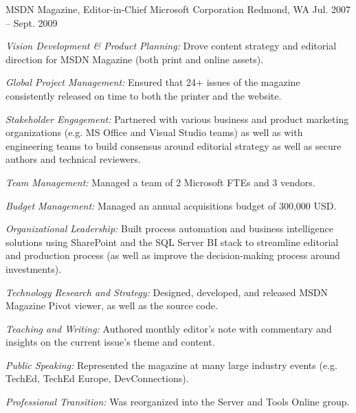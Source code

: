 \begin{cventries}
\cventry
{MSDN Magazine, Editor-in-Chief}
{Microsoft Corporation}
{Redmond, WA}
{Jul. 2007 – Sept. 2009}
{ %
\begin{cvitems}
\item {\emph{Vision Development \& Product Planning:} Drove content strategy and editorial direction for MSDN Magazine (both print and online assets).}
\item {\emph{Global Project Management:} Ensured that 24+ issues of the magazine consistently released on time to both the printer and the website.}
\item {\emph{Stakeholder Engagement:} Partnered with various business and product marketing organizations (e.g. MS Office and Visual Studio teams) as well as with engineering teams to build consensus around editorial strategy as well as secure authors and technical reviewers.}
\item {\emph{Team Management:} Managed a team of 2 Microsoft FTEs and 3 vendors.}
\item {\emph{Budget Management:} Managed an annual acquisitions budget of 300,000 USD.}
\item {\emph{Organizational Leadership:} Built process automation and business intelligence solutions using SharePoint and the SQL Server BI stack to streamline editorial and production process (as well as improve the decision-making process around investments).}
\item {\emph{Technology Research and Strategy:} Designed, developed, and released MSDN Magazine Pivot viewer, as well as the source code. }
\item {\emph{Teaching and Writing:} Authored monthly editor’s note with commentary and insights on the current issue’s theme and content.}
\item {\emph{Public Speaking:} Represented the magazine at many large industry events (e.g. TechEd, TechEd Europe, DevConnections).}
\item {\emph{Professional Transition:} Was reorganized into the Server and Tools Online group.}
\end{cvitems}
}



\end{cventries}
